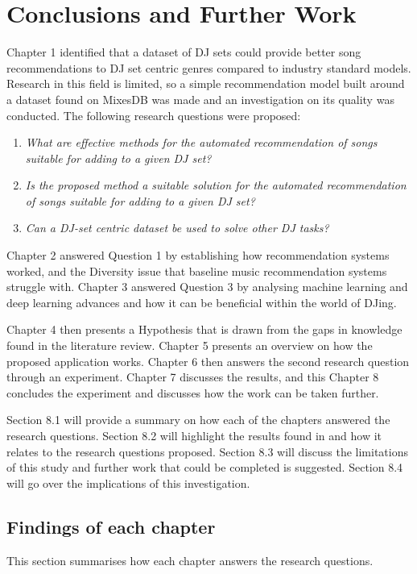 
\graphicspath{{Chapter7/}}

\chapter{Conclusions and Further Work} 

Chapter 1 identified that a dataset of  DJ sets could provide better song recommendations to DJ set centric genres compared to industry standard models. Research in this field is limited, so a simple recommendation model built around a dataset found on MixesDB was made and an investigation on its quality was conducted. The following research questions were proposed:

\begin{enumerate}
	\item \textit{What are effective methods for the automated recommendation of songs suitable
		for adding to a given DJ set?}
	\item \textit{Is the proposed method a suitable solution for the automated recommendation of songs suitable for adding to a given DJ set?}
	\item \textit{Can a DJ-set centric dataset be used to solve other DJ tasks?}
\end{enumerate}

Chapter 2 answered Question 1 by establishing how recommendation systems worked, and the Diversity issue that baseline music recommendation systems struggle with. Chapter 3 answered Question 3 by analysing machine learning and deep learning advances and how it can be beneficial within the world of DJing. 

Chapter 4 then presents a Hypothesis that is drawn from the gaps in knowledge found in the literature review. Chapter 5 presents an overview on how the proposed application works. Chapter 6 then answers the second research question through an experiment. Chapter 7 discusses the results, and this Chapter 8 concludes the experiment and discusses how the work can be taken further.

Section 8.1 will provide a summary on how each of the chapters answered the research questions.
Section 8.2 will highlight the results found in and how it relates to the research questions proposed. Section 8.3 will discuss the limitations of this study and further work that could be completed is suggested. Section 8.4 will go over the implications of this investigation.

\section{Findings of each chapter}
This section summarises how each chapter answers the research questions.

